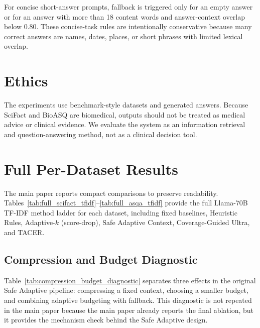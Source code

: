 \documentclass[11pt]{article}
\begin{document}
For concise short-answer prompts, fallback is triggered only for an empty answer or for an answer with more than 18 content words and answer-context overlap below 0.80. These concise-task rules are intentionally conservative because many correct answers are names, dates, places, or short phrases with limited lexical overlap.

\section{Ethics}

The experiments use benchmark-style datasets and generated answers. Because SciFact and BioASQ are biomedical, outputs should not be treated as medical advice or clinical evidence. We evaluate the system as an information retrieval and question-answering method, not as a clinical decision tool.

\section{Full Per-Dataset Results}

The main paper reports compact comparisons to preserve readability. Tables~\ref{tab:full_scifact_tfidf}--\ref{tab:full_asqa_tfidf} provide the full Llama-70B TF-IDF method ladder for each dataset, including fixed baselines, Heuristic Rules, Adaptive-$k$ (score-drop), Safe Adaptive Context, Coverage-Guided Ultra, and TACER.

\subsection{Compression and Budget Diagnostic}

Table~\ref{tab:compression_budget_diagnostic} separates three effects in the original Safe Adaptive pipeline: compressing a fixed context, choosing a smaller budget, and combining adaptive budgeting with fallback. This diagnostic is not repeated in the main paper because the main paper already reports the final ablation, but it provides the mechanism check behind the Safe Adaptive design.
\end{document}
